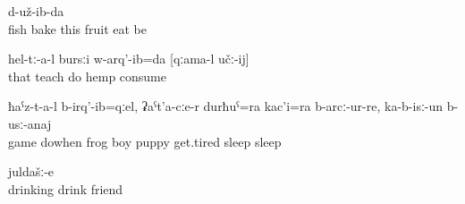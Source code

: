 \begin{enumerate}
\begin{exe}
		\ex	\label{ex:Frying fish, eating fruits we stayed}
			d-už-ib-da\\
			fish	bake	this	fruit	eat	be\\
		\glt	{}
	
		\ex	\label{ex:‎‎They taught me to smoke marihuana}
		\gll	hel-tː-a-l	bursːi	w-arq'-ib=da	[qːama-l	učː-ij]\\
			that	teach	do	hemp	consume\\
		\glt	{}
	
	\ex	\label{ex:‎When they played with the frog, the boy and his dog got tired and played down to sleep}
		\gll	ħaˁz-t-a-l	b-irq'-ib=qːel,	ʡaˁt'a-cːe-r	durħuˁ=ra	kac'i=ra b-arcː-ur-re,	ka-b-isː-un	b-usː-anaj\\
			game	dowhen	frog	boy\tsc{=add}	puppy	get.tired	sleep	sleep\\
		\glt	{}
		
		\ex	\label{ex:the drinking friends}
			juldašː-e\\
			drinking	drink	friend\\
		\glt	{}
	\end{exe}


\end{enumerate}
